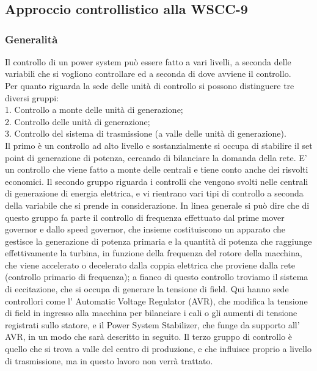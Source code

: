 \documentclass[Lau,noexaminfo]{sapthesis}
\begin{document}
	\chapter{}
	\section{Approccio controllistico alla WSCC-9}
	\subsection{Generalità}
	Il controllo di un power system può essere fatto a vari livelli, a seconda delle variabili che si vogliono controllare ed a seconda di dove avviene il controllo.\\
	Per quanto riguarda la sede delle unità di controllo si possono distinguere tre diversi gruppi:\\
	1. Controllo a monte delle unità di generazione;\\
	2. Controllo delle unità di generazione;\\
	3. Controllo del sistema di trasmissione (a valle delle unità di generazione).\\
	Il primo è un controllo ad alto livello e sostanzialmente si occupa di stabilire il set point di generazione di potenza, cercando di bilanciare la domanda della rete. E' un controllo che viene fatto a monte delle centrali e tiene conto anche dei risvolti economici. Il secondo gruppo riguarda i controlli che vengono svolti nelle centrali di generazione di energia elettrica, e vi rientrano vari tipi di controllo a seconda della variabile che si prende in considerazione. In linea generale si può dire che di questo gruppo fa parte il controllo di frequenza effettuato dal prime mover governor e dallo speed governor, che insieme costituiscono un apparato che gestisce la generazione di potenza primaria e la quantità di potenza che raggiunge effettivamente la turbina, in funzione della frequenza del rotore della macchina, che viene accelerato o decelerato dalla coppia elettrica che proviene dalla rete (controllo primario di frequenza);
	a fianco di questo controllo troviamo il sistema di eccitazione, che si occupa di generare la tensione di field. Qui hanno sede controllori come l' Automatic Voltage Regulator (AVR), che modifica la tensione di field in ingresso alla macchina per bilanciare i cali o gli aumenti di tensione registrati sullo statore, e il Power System Stabilizer, che funge da supporto all' AVR, in un modo che sarà descritto in seguito. Il terzo gruppo di controllo è quello che si trova a valle del centro di produzione, e che influisce proprio a livello di trasmissione, ma in questo lavoro non verrà trattato.
\end{document}
